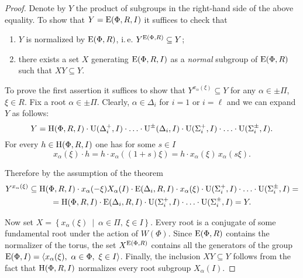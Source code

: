 \begin{proof}
Denote by $Y$ the product of subgroups in the right-hand side of the above equality.
To show that $Y=\operatorname{E}(\Phi,R,I)$ it suffices to check that
\begin{enumerate}
\item $Y$ is normalized by $\operatorname{E}(\Phi,R)$, i.\,e. $Y^{\operatorname{E}(\Phi,R)}\subseteq Y$;
\item there exists a set $X$ generating $\operatorname{E}(\Phi,R,I)$ as a \emph{normal} subgroup of $\operatorname{E}(\Phi,R)$ such that $XY\subseteq Y$.
\end{enumerate}
To prove the first assertion it suffices to show that $Y^{x_\alpha(\xi)} \subseteq Y$ for any $\alpha\in \pm \Pi$, $\xi\in R$.
Fix a root $\alpha\in\pm\Pi$. Clearly, $\alpha \in \Delta_i$ for $i=1$ or $i=\ell$ and we can expand $Y$ as follows:
\[ Y=\operatorname{H}(\Phi,R,I) \cdot \operatorname{U}(\Delta_i^+,I) \cdot \ldots \cdot \operatorname{U}^\pm(\Delta_i,I) \cdot \operatorname{U}(\Sigma_i^+,I) \cdot \ldots \cdot \operatorname{U}(\Sigma_i^\pm,I). \]
For every  $h \in \operatorname{H}(\Phi, R, I)$ one has for some $s\in I$
\[ x_\alpha(\xi)\cdot h = h\cdot x_\alpha((1+s)\xi)=h\cdot x_\alpha(\xi)\,x_\alpha(s\xi). \]

Therefore by the assumption of the theorem
\begin{multline*}
Y^{x_\alpha(\xi)} \subseteq \operatorname{H}(\Phi,R,I) \cdot x_\alpha(-\xi) X_{\alpha}(I) \cdot \operatorname{E}(\Delta_i,R,I)\cdot x_\alpha(\xi) \cdot \operatorname{U}(\Sigma^+_i,I) \cdot \ldots \cdot \operatorname{U}(\Sigma^\pm_i,I) =\\
= \operatorname{H}(\Phi, R, I) \cdot \operatorname{E}(\Delta_i,R,I) \cdot \operatorname{U}(\Sigma^+_i,I) \cdot \ldots \cdot \operatorname{U}(\Sigma^\pm_i,I) = Y.
\end{multline*}

Now set $X=\left\{x_\alpha(\xi)\ \middle|\ \alpha\in\Pi,\ \xi\in I \right\}$. 
Every root is a conjugate of some fundamental root under the action of $W(\Phi)$.
Since $\operatorname{E}(\Phi,R)$ contains the normalizer of the torus, the set $X^{\operatorname{E}(\Phi,R)}$ contains all the generators of the group $\operatorname{E}(\Phi, I) = \langle x_\alpha(\xi),\  \alpha\in\Phi,\ \xi\in I \rangle$.
Finally, the inclusion $XY \subseteq Y$ follows from the fact that $\operatorname{H}(\Phi,R,I)$ normalizes every root subgroup $X_\alpha(I)$.
\end{proof}


